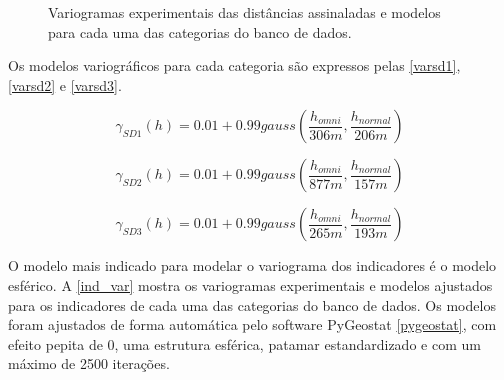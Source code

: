 \begin{figure}[H] 
\caption{Variogramas experimentais das distâncias assinaladas e modelos para cada uma das categorias do banco de dados.} \label{sd_var}
     \centering
\end{figure}

Os modelos variográficos para cada categoria são expressos pelas \autoref{varsd1}, \autoref{varsd2} e \autoref{varsd3}.

\begin{equation}
\label{varsd1}
\gamma_{SD1}(h)=0.01+0.99gauss\left(\frac{h_{omni}}{306m}, \frac{h_{normal}}{206m}\right)
\end{equation}

\begin{equation}
\label{varsd2}
\gamma_{SD2}(h)=0.01+0.99gauss\left(\frac{h_{omni}}{877m}, \frac{h_{normal}}{157m}\right)
\end{equation}

\begin{equation}
\label{varsd3}
\gamma_{SD3}(h)=0.01+0.99gauss\left(\frac{h_{omni}}{265m}, \frac{h_{normal}}{193m}\right)
\end{equation}

O modelo mais indicado para modelar o variograma dos indicadores é o modelo esférico. A \autoref{ind_var} mostra os variogramas experimentais e modelos ajustados para os indicadores de cada uma das categorias do banco de dados. Os modelos foram ajustados de forma automática pelo software PyGeostat \autoref{pygeostat}, com efeito pepita de 0, uma estrutura esférica, patamar estandardizado e com um máximo de 2500 iterações. 

